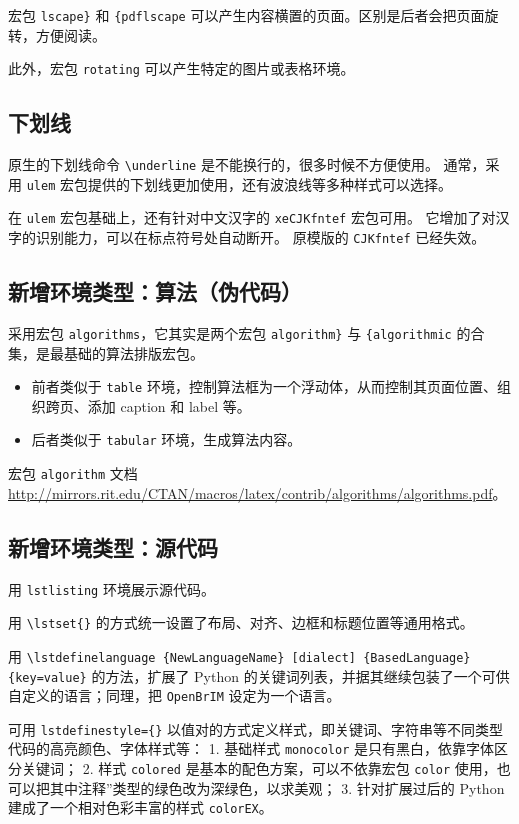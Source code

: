 \documentclass[../Main/thesis.tex]{subfiles}
\begin{document}
宏包 \texttt{lscape\}} 和 \texttt{\{pdflscape}
可以产生内容横置的页面。区别是后者会把页面旋转，方便阅读。

此外，宏包 \texttt{rotating} 可以产生特定的图片或表格环境。

\subsection{下划线}

原生的下划线命令 \texttt{\textbackslash{}underline}
是不能换行的，很多时候不方便使用。 通常，采用 \texttt{ulem}
宏包提供的下划线更加使用，还有波浪线等多种样式可以选择。

在 \texttt{ulem} 宏包基础上，还有针对中文汉字的
\texttt{xeCJKfntef} 宏包可用。
它增加了对汉字的识别能力，可以在标点符号处自动断开。 原模版的
\texttt{CJKfntef} 已经失效。

\subsection{新增环境类型：算法（伪代码）}

采用宏包 \texttt{algorithms}，它其实是两个宏包
\texttt{algorithm\}} 与 \texttt{\{algorithmic}
的合集，是最基础的算法排版宏包。

\begin{itemize}
\item
  前者类似于 \texttt{table}
  环境，控制算法框为一个浮动体，从而控制其页面位置、组织跨页、添加
  caption 和 label 等。
\item
  后者类似于 \texttt{tabular} 环境，生成算法内容。
\end{itemize}

宏包 \texttt{algorithm} 文档
\url{http://mirrors.rit.edu/CTAN/macros/latex/contrib/algorithms/algorithms.pdf}。

\subsection{新增环境类型：源代码}

用 \texttt{lstlisting} 环境展示源代码。

用 \texttt{\textbackslash{}lstset\{\}}
的方式统一设置了布局、对齐、边框和标题位置等通用格式。

用
\texttt{\textbackslash{}lstdefinelanguage \{NewLanguageName\} [dialect] \{BasedLanguage\} \{key=value\}}
的方法，扩展了 Python
的关键词列表，并据其继续包装了一个可供自定义的语言；同理，把
\texttt{OpenBrIM} 设定为一个语言。

可用 \texttt{lstdefinestyle=\{\}}
以值对的方式定义样式，即关键词、字符串等不同类型代码的高亮颜色、字体样式等：
1. 基础样式 \texttt{monocolor} 是只有黑白，依靠字体区分关键词； 2. 样式
\texttt{colored} 是基本的配色方案，可以不依靠宏包 \texttt{color}
使用，也可以把其中注释''类型的绿色改为深绿色，以求美观； 3.
针对扩展过后的 Python 建成了一个相对色彩丰富的样式 \texttt{colorEX}。
\end{document}
